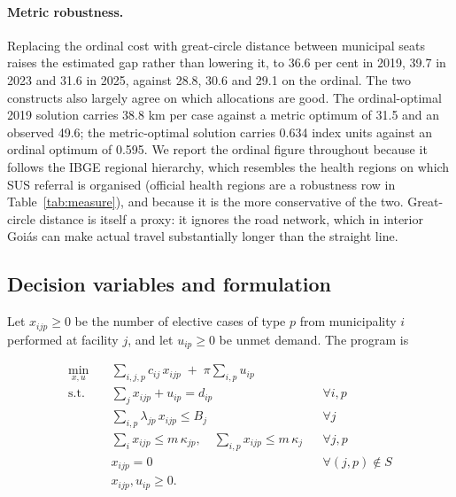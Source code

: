 \paragraph{Metric robustness.} Replacing the ordinal cost with great-circle
distance between municipal seats raises the estimated gap rather than lowering
it, to 36.6 per cent in 2019, 39.7 in 2023 and 31.6 in 2025, against 28.8, 30.6
and 29.1 on the ordinal. The two constructs also largely agree on which
allocations are good. The ordinal-optimal 2019 solution carries 38.8 km per case
against a metric optimum of 31.5 and an observed 49.6; the metric-optimal
solution carries 0.634 index units against an ordinal optimum of 0.595. We
report the
ordinal figure throughout because it follows the IBGE regional hierarchy, which
resembles the health regions on which SUS referral is organised (official health
regions are a robustness row in Table~\ref{tab:measure}), and because it is the more conservative of the two.
Great-circle distance is itself a proxy: it ignores the road network, which in
interior Goi\'as can make actual travel substantially longer than the straight
line.

\subsection{Decision variables and formulation}
\label{sec:formulation}

Let $x_{ijp} \geq 0$ be the number of elective cases of type $p$ from
municipality $i$ performed at facility $j$, and let $u_{ip} \geq 0$ be unmet
demand. The program is

\begin{align}
\min_{x, u} \quad & \sum_{i,j,p} c_{ij}\, x_{ijp} \;+\; \pi \sum_{i,p} u_{ip} \label{eq:obj}\\
\text{s.t.} \quad & \sum_{j} x_{ijp} + u_{ip} = d_{ip} && \forall i, p \label{eq:demand}\\
& \sum_{i,p} \lambda_{jp}\, x_{ijp} \leq B_j && \forall j \label{eq:capacity}\\
& \sum_{i} x_{ijp} \leq m\,\kappa_{jp}, \quad \sum_{i,p} x_{ijp} \leq m\,\kappa_{j} && \forall j, p \label{eq:cap}\\
& x_{ijp} = 0 && \forall (j,p) \notin S \label{eq:scope}\\
& x_{ijp}, u_{ip} \geq 0. \nonumber
\end{align}

